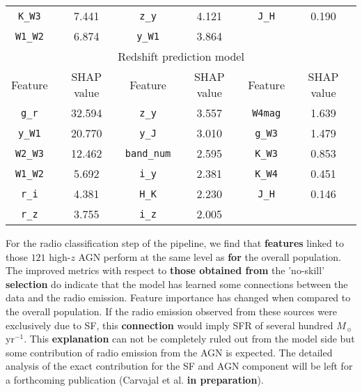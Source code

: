 \documentclass{aa}
\begin{document}
\begin{table}
{\begin{tabular}{c c c c c c}
\texttt{K\_W3}    &  7.441        & \texttt{z\_y}         & 4.121         & \texttt{J\_H}       & 0.190      \\
\texttt{W1\_W2}   &  6.874        & \texttt{y\_W1}        & 3.864         &                     &            \\[0.5em]
\hline\hline
\multicolumn{6}{c}{Redshift prediction model} \\
Feature             & SHAP value    & Feature             & SHAP value    & Feature         & SHAP value \\
\hline
\texttt{g\_r}       & 32.594        & \texttt{z\_y}       & 3.557         & \texttt{W4mag}  & 1.639    \\
\texttt{y\_W1}      & 20.770        & \texttt{y\_J}       & 3.010         & \texttt{g\_W3}  & 1.479    \\
\texttt{W2\_W3}     & 12.462        & \texttt{band\_num}  & 2.595         & \texttt{K\_W3}  & 0.853    \\
\texttt{W1\_W2}     &  5.692        & \texttt{i\_y}       & 2.381         & \texttt{K\_W4}  & 0.451    \\
\texttt{r\_i}       &  4.381        & \texttt{H\_K}       & 2.230         & \texttt{J\_H}   & 0.146    \\
\texttt{r\_z}       &  3.755        & \texttt{i\_z}       & 2.005         &                 &          \\
\hline
\end{tabular}
}
\end{table}

For the radio classification step of the pipeline, we find that \textbf{features} linked to those $121$ high-$z$ AGN perform at the same level as \textbf{for} the overall population. %
The improved metrics with respect to \textbf{those obtained from} the 'no-skill' \textbf{selection} do indicate that the model has learned some connections between the data and the radio emission. Feature importance has changed when compared to the overall population. If the radio emission observed from these sources were exclusively due to SF, this \textbf{connection} would imply SFR of several hundred $M_\sun$\,yr$^{-1}$. This \textbf{explanation} can not be completely ruled out from the model side but some contribution of radio emission from the AGN is expected. The detailed analysis of the exact contribution for the SF and AGN component will be left for a forthcoming publication (Carvajal et al. \textbf{in preparation}). 
\end{document}
